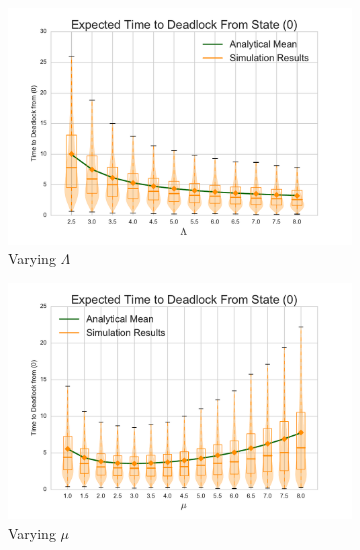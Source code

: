 \documentclass{article}
\numberwithin{equation}{section}
\begin{document}
\begin{figure}[!htbp]
  \begin{center}
  \begin{subfigure}[b]{0.35\textwidth}
    \includegraphics[width=\textwidth]{images/varyL_1Nms}
    \caption{Varying $\Lambda$}
    \label{fig:1Nms_L}
  \end{subfigure}
  \begin{subfigure}[b]{0.35\textwidth}
    \includegraphics[width=\textwidth]{images/varymu_1Nms}
    \caption{Varying $\mu$}
    \label{fig:1Nms_mu}
  \end{subfigure}\\
  \begin{subfigure}[b]{0.35\textwidth}

\end{subfigure}
\end{center}
\end{figure}
\end{document}
